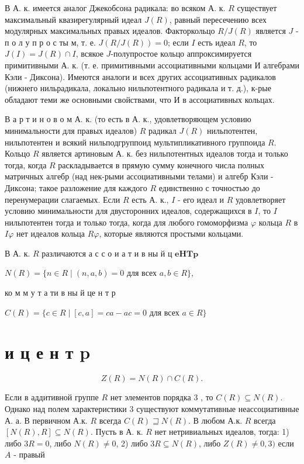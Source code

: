 \documentclass[10pt]{article}
\begin{document}
В А. к. имеется аналог Джекобсона радикала: во всяком А. к. $R$ существует максимальный квазирегулярный идеал $J(R)$, равный пересечению всех модулярных максимальных правых идеалов. Факторкольцо $R / J(R)$ является $J$ - п о л у п р о с ты м, т. е. $J(R / J(R))=0$; если $I$ есть идеал $R$, то $J(I)=J(R) \cap I$, всякое $J$-полупростое кольцо аппроксимируется примитивными А. к. (т. е. примитивными ассоциативными кольцами И алгебрами Кэли - Диксона). Имеются аналоги и всех других ассоциативных радикалов (нижнего нильрадикала, локально нильпотентного радикала и т. д.), к-рые обладают теми же основными свойствами, что И в ассоциативных кольцах.



В а р т и н о в о м А. к. (то есть в А. к., удовлетворяющем условию минимальности для правых идеалов) $R$ радикал $J(R)$ нильпотентен, нильпотентен и всякий нильподгруппоид мультипликативного группоида $R$. Кольцо $R$ является артиновым А. к. без нильпотентных идеалов тогда и только тогда, когда $R$ раскладывается в прямую сумму конечного числа полных матричных алгебр (над нек-рыми ассоциативными телами) и алгебр Кэли - Диксона; такое разложение для каждого $R$ единственно с точностью до перенумерации слагаемых. Если $R$ есть А. к., $I$ - его идеал и $R$ удовлетворяет условию минимальности для двусторонних идеалов, содержащихся в $I$, то $I$ нильпотентен тогда и только тогда, когда для любого гомоморфизма $\varphi$ кольца $R$ в $I \varphi$ нет идеалов кольца $R \varphi$, которые являются простыми кольцами.



В А. к. $R$ различаются а с с о и а т и в ны й ц $\mathbf{e} \mathbf{H} \mathbf{T} \mathbf{p}$



$N(R)=\{n \in R \mid(n, a, b)=0$ для всех $a, b \in R\}$,



ко м м у т а ти в ны й це н т р



$C(R)=\{c \in R \mid[c, a]=c a-a c=0$ для всех $a \in R\}$



\section{и ц е н т p}

\[

Z(R)=N(R) \cap C(R) .

\]



Если в аддитивной группе $R$ нет элементов порядка 3 , то $C(R) \subseteq N(R)$. Однако над полем характеристики 3 существуют коммутативные неассоциативные А. а. В первичном А.к. $R$ всегда $C(R) \sqsupseteq N(R)$. В любом А.к. $R$ всегда $[N(R), R] \subseteq N(R)$. Пусть в А. к. $R$ нет нетривиальных идеалов, тогда: 1) либо $3 R=0$, либо $N(R) \neq 0$, 2) либо $3 R \subseteq N(R)$, либо $Z(R) \neq 0,3)$ если $A$ - правый
\end{document}
